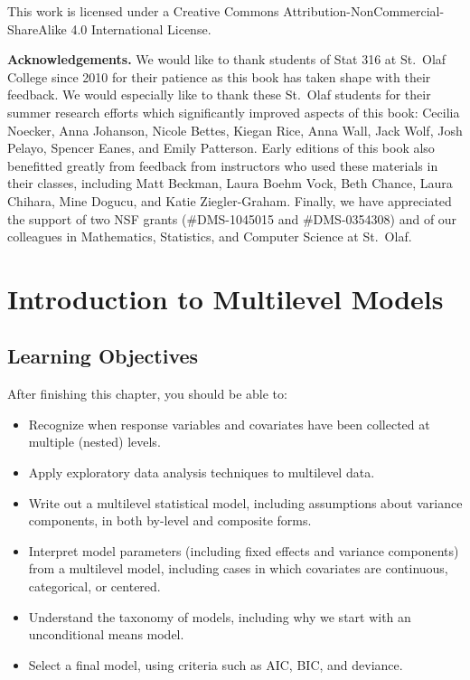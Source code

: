 \documentclass[
]{krantz}
\providecommand{\tightlist}{%
  \setlength{\itemsep}{0pt}\setlength{\parskip}{0pt}}
\begin{document}
This work is licensed under a Creative Commons Attribution-NonCommercial-ShareAlike 4.0 International License.

\textbf{Acknowledgements.} We would like to thank students of Stat 316 at St.~Olaf College since 2010 for their patience as this book has taken shape with their feedback. We would especially like to thank these St.~Olaf students for their summer research efforts which significantly improved aspects of this book: Cecilia Noecker, Anna Johanson, Nicole Bettes, Kiegan Rice, Anna Wall, Jack Wolf, Josh Pelayo, Spencer Eanes, and Emily Patterson. Early editions of this book also benefitted greatly from feedback from instructors who used these materials in their classes, including Matt Beckman, Laura Boehm Vock, Beth Chance, Laura Chihara, Mine Dogucu, and Katie Ziegler-Graham. Finally, we have appreciated the support of two NSF grants (\#DMS-1045015 and \#DMS-0354308) and of our colleagues in Mathematics, Statistics, and Computer Science at St.~Olaf.

\hypertarget{ch-multilevelintro}{%
\chapter{Introduction to Multilevel Models}\label{ch-multilevelintro}}

\hypertarget{learning-objectives}{%
\section{Learning Objectives}\label{learning-objectives}}

After finishing this chapter, you should be able to:

\begin{itemize}
\tightlist
\item
  Recognize when response variables and covariates have been collected at multiple (nested) levels.
\item
  Apply exploratory data analysis techniques to multilevel data.
\item
  Write out a multilevel statistical model, including assumptions about variance components, in both by-level and composite forms.
\item
  Interpret model parameters (including fixed effects and variance components) from a multilevel model, including cases in which covariates are continuous, categorical, or centered.
\item
  Understand the taxonomy of models, including why we start with an unconditional means model.
\item
  Select a final model, using criteria such as AIC, BIC, and deviance.
\end{itemize}
\end{document}
